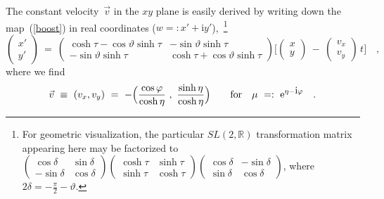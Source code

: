 \documentclass[a4paper,11pt]{article}
\numberwithin{equation}{section}
\def\de{\delta}
\newcommand{\R}{\mathbb R}
\def\e{\mbox{e}}
\def\i{\mbox{i}}
\begin{document}
The constant velocity~$\vec v$ in the $xy$ plane is easily derived
by writing down the map~(\ref{boost}) in real coordinates
($w{=}{:}x'{+}\i y'$),~\footnote{
For geometric visualization,
the particular $SL(2,\R)$ transformation matrix appearing here may be
factorized to
$\begin{pmatrix} \cos\de & \sin\de \\ -\sin\de & \cos\de \end{pmatrix}
\begin{pmatrix} \cosh\tau&\sinh\tau\\ \sinh\tau&\cosh\tau \end{pmatrix}
\begin{pmatrix} \cos\de & -\sin\de \\ \sin\de & \cos\de \end{pmatrix}$,
where $2\de=-\frac{\pi}{2}-\vartheta$.
}
\begin{equation} \label{realboost}
\begin{pmatrix} x' \\[4pt] y' \end{pmatrix}\ =\
\begin{pmatrix}
\cosh\tau-\cos\vartheta\sinh\tau & -\sin\vartheta\sinh\tau \\[4pt]
-\sin\vartheta\sinh\tau & \cosh\tau+\cos\vartheta\sinh\tau
\end{pmatrix}
\biggl[
\begin{pmatrix} x \\[4pt] y \end{pmatrix}\ -\
\begin{pmatrix} v_x \\[4pt] v_y \end{pmatrix} \,t
\biggr] \quad,
\end{equation}
where we find
\begin{equation}\label{velo}
\vec{v}\ \equiv\ (v_x,v_y)\ =\
-\Bigl(\frac{\cos\varphi}{\cosh\eta}\ ,\ \frac{\sinh\eta}{\cosh\eta}\Bigr)
\qquad\textrm{for}\quad
\mu\ =:\ \e^{\eta-\i\varphi} \quad.
\end{equation}
\end{document}

